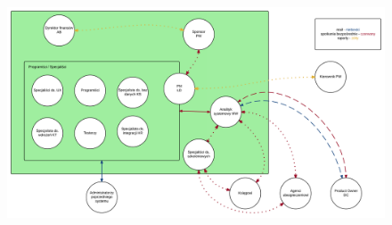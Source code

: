 \documentclass{article}
\begin{document}
\eject \pdfpagewidth=17in \pdfpageheight=11in
\begin{figure}
 \centering 
 \includegraphics[scale=0.7]{komunikacja.pdf}
\end{figure}
\end{document}
